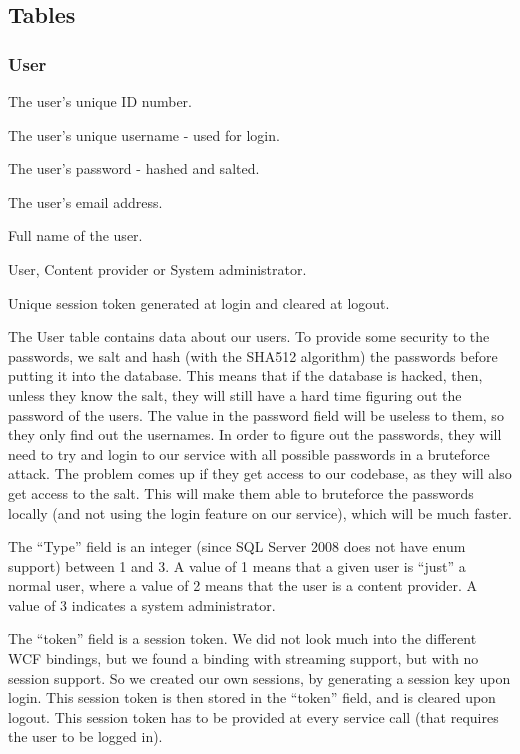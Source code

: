 \subsection{Tables}
\label{Design_Database_Tables}

\subsubsection{User}
\label{Design_Database_Tables_User}

\begin{my_description}
\item[user\_id] The user's unique ID number.
\item[username] The user's unique username - used for login.
\item[password] The user's password - hashed and salted.
\item[email] The user's email address.
\item[full\_name] Full name of the user.
\item[type] User, Content provider or System administrator.
\item[token] Unique session token generated at login and cleared at logout.
\end{my_description}

The User table contains data about our users. To provide some security to the passwords, we salt and hash (with the SHA512 algorithm) the passwords before putting it into the database. This means that if the database is hacked, then, unless they know the salt, they will still have a hard time figuring out the password of the users. The value in the password field will be useless to them, so they only find out the usernames. In order to figure out the passwords, they will need to try and login to our service with all possible passwords in a bruteforce attack. The problem comes up if they get access to our codebase, as they will also get access to the salt. This will make them able to bruteforce the passwords locally (and not using the login feature on our service), which will be much faster.

The ``Type'' field is an integer (since SQL Server 2008 does not have enum support) between 1 and 3. A value of 1 means that a given user is ``just'' a normal user, where a value of 2 means that the user is a content provider. A value of 3 indicates a system administrator.

The ``token'' field is a session token. We did not look much into the different WCF bindings, but we found a binding with streaming support, but with no session support. So we created our own sessions, by generating a session key upon login. This session token is then stored in the ``token'' field, and is cleared upon logout. This session token has to be provided at every service call (that requires the user to be logged in).


